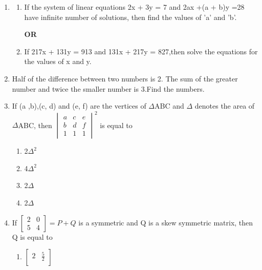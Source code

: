 \documentclass[12pt,-letter paper]{article}
\begin{document}
\begin{enumerate}
\begin{enumerate}[label=(\alph*)]
\end{enumerate}
\item
\begin{enumerate}[label=(\alph*)]
\item If the system of linear equations \newline 2x + 3y = 7 and  2ax +(a + b)y =28 \newline have infinite number of solutions, then find the values of 'a' and 'b'.
\begin{center}{\textbf{OR}}
\end{center}
\item  If 217x + 131y = 913 and \newline
131x + 217y = 827,\newline then solve the equations for the values of x and y.
\end{enumerate}
\item Half of the difference between two numbers is 2. The sum of the greater number and twice the smaller number is 3.Find the numbers.\newpage
\item If (a ,b),(c, d) and (e, f) are the vertices of $\Delta$ABC and $\Delta$ denotes the area of $\Delta$ABC, then 
\begin{math}
   \begin{vmatrix}
a & c & e\\
b & d& f\\
1&1&1
\end{vmatrix}^2 
\end{math}
 is equal to
\begin{enumerate}[label=(\alph*)]
    \item 2$\Delta ^2$
    \item 4$\Delta ^2$ 
    \item 2$\Delta$
    \item 2$\Delta$
\end{enumerate}
    \item If 
\begin{math}
\begin{bmatrix}
2 & 0 \\
5 & 4 
\end{bmatrix} = P + Q
\end{math}
is a symmetric and Q is a skew symmetric matrix, then Q is equal to
\begin{enumerate}[label=(\alph*)]
    \item \begin{math}
\begin{bmatrix}
2  & \frac{5}{2} \\

\end{bmatrix}
\end{math}
\end{enumerate}
\end{enumerate}
\end{document}
